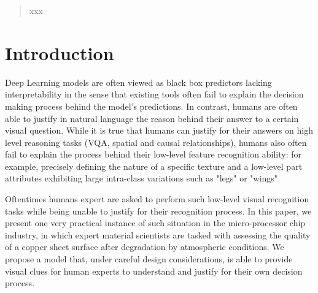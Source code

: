 \documentclass[10pt,twocolumn,letterpaper]{article}
\begin{document}
\title{}

\author{
Tristan Hascoet\\
Kobe University\\
{\tt\small tristan@people.kobe-u.ac.jp}
\and
To-san\\
Kobe University\\
{\tt\small xxx}
\and
Mec people1\\
xxx\\
xxx\\
{\tt\small xxx}
\and
Mec people2\\
xxx\\
xxx\\
{\tt\small xxx}
\and
Yasuo Ariki\\
xxx\\
xxx\\
{\tt\small xxx}
\and
Tetusya Takiguchi\\
xxx\\
xxx\\
{\tt\small xxx}
}

\maketitle


\begin{abstract}
xxx
\end{abstract}

\section{Introduction}

Deep Learning models are often viewed as black box predictors lacking interpretability 
in the sense that existing tools often fail to explain the decision making process behind the model’s predictions.
In contrast, humans are often able to justify in natural language the reason behind their answer to a certain visual question.
While it is true that humans can justify for their answers on high level reasoning tasks (VQA, spatial and causal relationships), 
humans also often fail to explain the process behind their low-level feature recognition ability:
for example, precisely defining the nature of a specific texture and a low-level part attributes exhibiting large intra-class variations such as "legs" or "wings"

Oftentimes humans expert are asked to perform such low-level visual 
recognition tasks while being unable to justify for their recognition process.
In this paper, we present one very practical instance of such situation in the micro-processor chip industry, 
in which expert material scientists are tasked with assessing the quality of a copper sheet 
surface after degradation by atmospheric conditions.
We propose a model that, under careful design considerations, is able to provide visual clues 
for human experts to understand and justify for their own decision process.
\end{document}
